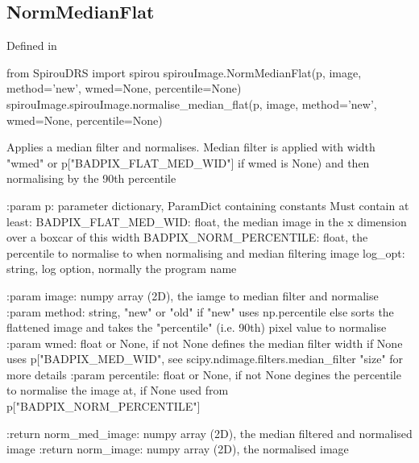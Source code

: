 
\begin{minipage}{\textwidth}
\subsection{NormMedianFlat}

Defined in \spirouImage{}

\begin{pythonbox}
from SpirouDRS import spirou
spirouImage.NormMedianFlat(p, image, method='new', wmed=None, percentile=None)
spirouImage.spirouImage.normalise_median_flat(p, image, method='new', wmed=None, percentile=None)
\end{pythonbox}

\begin{pythondocstring}
Applies a median filter and normalises. Median filter is applied with width
"wmed" or p["BADPIX_FLAT_MED_WID"] if wmed is None) and then normalising by
the 90th percentile

:param p: parameter dictionary, ParamDict containing constants
    Must contain at least:
            BADPIX_FLAT_MED_WID: float, the median image in the x
                                 dimension over a boxcar of this width
            BADPIX_NORM_PERCENTILE: float, the percentile to normalise
                                    to when normalising and median
                                    filtering image
            log_opt: string, log option, normally the program name

:param image: numpy array (2D), the iamge to median filter and normalise
:param method: string, "new" or "old" if "new" uses np.percentile else
               sorts the flattened image and takes the "percentile" (i.e.
               90th) pixel value to normalise
:param wmed: float or None, if not None defines the median filter width
             if None uses p["BADPIX_MED_WID", see
             scipy.ndimage.filters.median_filter "size" for more details
:param percentile: float or None, if not None degines the percentile to
                   normalise the image at, if None used from
                   p["BADPIX_NORM_PERCENTILE"]

:return norm_med_image: numpy array (2D), the median filtered and normalised
                        image
:return norm_image: numpy array (2D), the normalised image
\end{pythondocstring}
\end{minipage}


